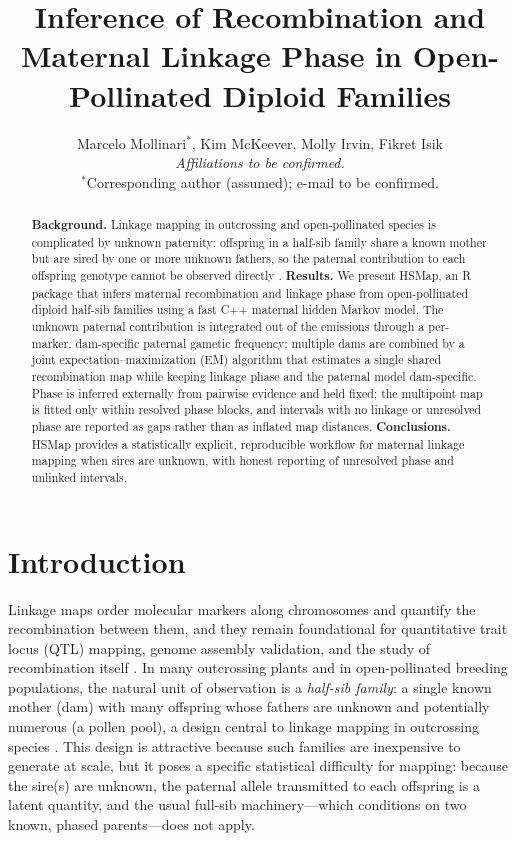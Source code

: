 \documentclass[11pt]{article}
\title{Inference of Recombination and Maternal Linkage Phase in Open-Pollinated Diploid Families}
\author{%
  Marcelo Mollinari$^{\ast}$, Kim McKeever, Molly Irvin, Fikret Isik\\[6pt]
  {\normalsize\itshape Affiliations to be confirmed.}\\
  {\normalsize $^{\ast}$Corresponding author (assumed); e-mail to be confirmed.}
}
\date{}   %
\begin{document}
\maketitle

\begin{abstract}
\noindent\textbf{Background.} Linkage mapping in outcrossing and open-pollinated
species is complicated by unknown paternity: offspring in a half-sib family share a
known mother but are sired by one or more unknown fathers, so the paternal contribution
to each offspring genotype cannot be observed directly \citep{GrattapagliaSederoff1994}.
\noindent\textbf{Results.} We present \textsf{HSMap}, an \textsf{R} package that infers
maternal recombination and linkage phase from open-pollinated diploid half-sib families
using a fast \textsf{C++} maternal hidden Markov model. The unknown paternal
contribution is integrated out of the emissions through a per-marker, dam-specific
paternal gametic frequency; multiple dams are combined by a joint
expectation--maximization (EM) algorithm that estimates a single shared recombination
map while keeping linkage phase and the paternal model dam-specific. Phase is inferred
externally from pairwise evidence and held fixed; the multipoint map is fitted only
within resolved phase blocks, and intervals with no linkage or unresolved phase are
reported as gaps rather than as inflated map distances.
\noindent\textbf{Conclusions.} \textsf{HSMap} provides a statistically explicit,
reproducible workflow for maternal linkage mapping when sires are unknown, with honest
reporting of unresolved phase and unlinked intervals.
\end{abstract}

\section{Introduction}
Linkage maps order molecular markers along chromosomes and quantify the recombination
between them, and they remain foundational for quantitative trait locus (QTL) mapping,
genome assembly validation, and the study of recombination itself
\citep{LanderBotstein1989}.
In many outcrossing plants and in open-pollinated breeding populations, the natural unit
of observation is a \emph{half-sib family}: a single known mother (dam) with many
offspring whose fathers are unknown and potentially numerous (a pollen pool), a design
central to linkage mapping in outcrossing species \citep{GrattapagliaSederoff1994}.
This design is attractive because such families are inexpensive to generate at scale,
but it poses a specific statistical difficulty for mapping: because the sire(s) are
unknown, the paternal allele transmitted to each offspring is a latent quantity, and the
usual full-sib machinery---which conditions on two known, phased parents---does not
apply.
\end{document}
